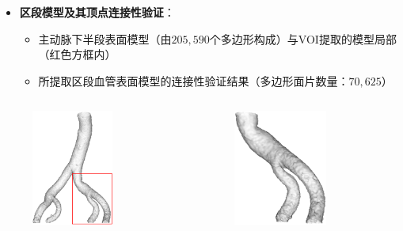 \begin{frame}
\begin{itemize}
  \item \textbf{区段模型及其顶点连接性验证}：
  \begin{itemize}
     \item 主动脉下半段表面模型（由$205,590$个多边形构成）与VOI提取的模型局部（红色方框内）
     \item 所提取区段血管表面模型的连接性验证结果（多边形面片数量：$70,625$）
  \end{itemize}
\end{itemize}
\begin{columns}[b,onlytextwidth]
\begin{column}{.5\textwidth}
 \begin{figure}[t]
\centering
\includegraphics[height=1.5in]{../../Figures/postprocessing/centerlines/VOI.eps}
\end{figure}
\end{column}
\begin{column}{.5\textwidth}
 \begin{figure}[t]
\centering
\includegraphics[height=1.5in]{../../Figures/postprocessing/centerlines/connectivity_local.eps}
\end{figure}
\end{column}
\end{columns}
\end{frame}

